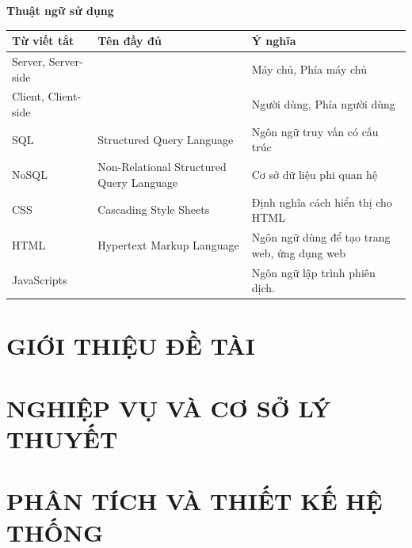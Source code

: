 \documentclass[12pt,a4paper]{report}
\begin{document}
\newpage
\begin{center}
\textbf{\LARGE Thuật ngữ sử dụng}
\end{center}


\begin{center}
\begin{tabularx}{\textwidth}{|X|X|X|}
\hline
 \textbf{Từ viết tắt} & \textbf{Tên đầy đủ} & \textbf{Ý nghĩa} \\
 \hline
 Server, Server-side & & Máy chủ, Phía máy chủ \\  
 Client, Client-side & & Người dùng, Phía người dùng \\
 SQL & Structured Query Language & Ngôn ngữ truy vấn có cấu trúc \\
 NoSQL & Non-Relational Structured Query Language & Cơ sở dữ liệu phi quan hệ \\
 CSS & Cascading Style Sheets & Định nghĩa cách hiển thị cho HTML \\
 HTML & Hypertext Markup Language & Ngôn ngữ dùng để tạo trang web, ứng dụng web \\
 JavaScripts & & Ngôn ngữ lập trình phiên dịch. \\
 \hline
\end{tabularx}
\end{center}

\newpage
\tableofcontents
\newpage
\listoffigures
\newpage
\listoftables
\newpage
\clearpage
\pagestyle{fancy}

\chapter{\textbf{GIỚI THIỆU ĐỀ TÀI}}


\chapter{\textbf{NGHIỆP VỤ VÀ CƠ SỞ LÝ THUYẾT}}


\chapter{\textbf{PHÂN TÍCH VÀ THIẾT KẾ HỆ THỐNG}}


\end{document}

